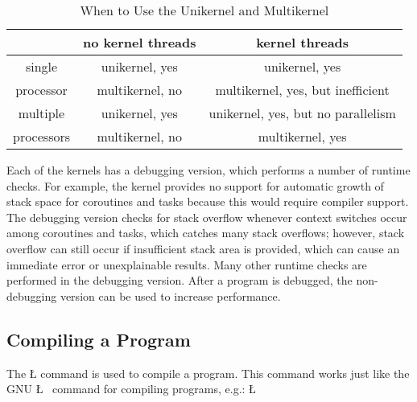 \documentclass[openright,twoside]{report}
\begin{document}
\begin{table}[htbp]
\center
\begin{tabular}{c||c|c}
			& no kernel threads		& kernel threads						\\
\hline
\hline
single		& unikernel, yes		& unikernel, yes						\\
processor	& multikernel, no		& multikernel, yes, but inefficient		\\
\hline
multiple	& unikernel, yes		& unikernel, yes, but no parallelism	\\
processors	& multikernel, no		& multikernel, yes						\\
\end{tabular}

\caption{When to Use the Unikernel and Multikernel}
\label{t:WhenToUseuKernel}
\end{table}

Each of the \uC kernels has a debugging version, which performs a number of runtime checks.
For example, the \uC kernel provides no support for automatic growth of stack space for coroutines and tasks because this would require compiler support.
The debugging version checks for stack overflow whenever context switches occur among coroutines and tasks, which catches many stack overflows;
however, stack overflow can still occur if insufficient stack area is provided, which can cause an immediate error or unexplainable results.
Many other runtime checks are performed in the debugging version.
After a program is debugged, the non-debugging version can be used to increase performance.


\subsection{\texorpdfstring{Compiling a \uC Program}{Compiling a uC++ Program}}
\label{s:CompilinguCProgram}

The \LGinlinetrue\LGbegin\lgrinde\L{}\endlgrinde\LGend{} command is used to compile a \uC program.
This command works just like the GNU \LGinlinetrue\LGbegin\lgrinde\L{}\endlgrinde\LGend{}~\cite{GNU-C++} command for compiling \CC programs, e.g.:
\LGinlinefalse\LGbegin\lgrinde
\L{}
\endlgrinde\LGend
\end{document}
